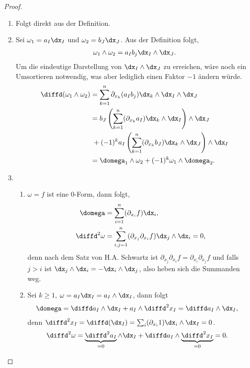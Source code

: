 \begin{proof}
\begin{enumerate}[label=\arabic{*}.)]
\item Folgt direkt aus der Definition.
\item Sei $\omega_1 = a_I\dx_I$ und $\omega_2 = b_J\dx_J$. Aus der Definition
folgt,
\begin{align*}
\omega_1\land\omega_2 = a_I b_j \dx_I\land \dx_J.
\end{align*}
Um die eindeutige Darstellung von  $\dx_I\land \dx_J$ zu erreichen, wäre noch
ein Umsortieren notwendig, was aber lediglich einen Faktor $-1$ ändern würde.
\begin{align*}
\diffd(\omega_1\land\omega_2) &= \sum\limits_{k=1}^n \partial_{x_k} (a_Ib_j)
\dx_k\land\dx_I\land\dx_J\\ 
&= b_J\left(\sum\limits_{k=1}^n (\partial_{x_k} a_I)
\dx_k\land\dx_I\right)\land\dx_J
\\ &\;+ (-1)^ka_I\left(\sum\limits_{k=1}^n (\partial_{x_k} b_J)
\dx_k\land\dx_J\right)\land\dx_I\\
&= \domega_1\land\omega_2 + (-1)^k \omega_1\land\domega_2.
\end{align*}
\item\begin{enumerate}[label=\alph{*})]
\item$\omega=f$ ist eine $0$-Form, dann folgt,
\begin{align*}
\domega &= \sum\limits_{i=1}^n (\partial_{x_i} f) \dx_i,\\
\diffd^2\omega &= \sum\limits_{i,j=1}^n (\partial_{x_j}\partial_{x_i} f)
\dx_j\land\dx_i = 0,
\end{align*} 
denn nach dem Satz von H.A. Schwartz ist $\partial_{x_j}\partial_{x_i} f =
\partial_{x_i}\partial_{x_j} f$ und falls $j>i$ ist $\dx_j\land\dx_i =
-\dx_i\land\dx_j$, also heben sich die Summanden weg.
\item Sei $k\ge 1$, $\omega = a_I\dx_I = a_I\land \dx_I$, dann folgt
\begin{align*}
\domega &= \diffd a_I\land \dx_I + a_I \land \diffd^2x_I = \diffd a_I \land \dx_I,
\end{align*}
denn $\diffd^2x_I = \diffd(\dx_I)=\sum_i (\partial_{x_i} 1)\dx_i\land\dx_I
= 0$.
\begin{align*}
\diffd^2\omega &= \underbrace{\diffd^2 a_I}_{=0} \land \dx_I + \diffd a_I \land
\underbrace{\diffd^2x_I}_{=0} = 0.\qedhere
\end{align*}
\end{enumerate}
\end{enumerate}
\end{proof}

